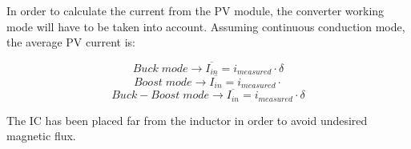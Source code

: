 In order to calculate the current from the PV module, the converter working mode will have to be taken into account. Assuming continuous conduction mode, the average PV current is:


\begin{equation} 
	Buck \; mode \rightarrow \overline{I_{in}} = i_{measured} \cdot \delta
\end{equation}
\begin{equation} 
Boost \; mode \rightarrow \overline{I_{in}} = i_{measured} \cdot
\end{equation}
\begin{equation} 
Buck-Boost \; mode \rightarrow \overline{I_{in}} = i_{measured} \cdot \delta
\end{equation}

The IC has been placed far from the inductor in order to avoid undesired magnetic flux.


